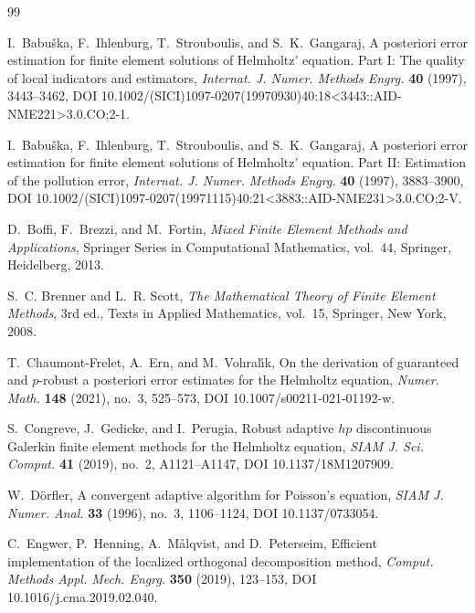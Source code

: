 \begin{thebibliography}{99}

I.~Babu\v{s}ka, F.~Ihlenburg, T.~Strouboulis, and S.~K.~Gangaraj,
A posteriori error estimation for finite element solutions of Helmholtz'
equation. Part I: The quality of local indicators and estimators,
\emph{Internat. J. Numer. Methods Engrg.} \textbf{40} (1997),
3443--3462,
DOI 10.1002/(SICI)1097-0207(19970930)40:18<3443::AID-NME221>3.0.CO;2-1.

I.~Babu\v{s}ka, F.~Ihlenburg, T.~Strouboulis, and S.~K.~Gangaraj,
A posteriori error estimation for finite element solutions of Helmholtz'
equation. Part II: Estimation of the pollution error,
\emph{Internat. J. Numer. Methods Engrg.} \textbf{40} (1997),
3883--3900,
DOI 10.1002/(SICI)1097-0207(19971115)40:21<3883::AID-NME231>3.0.CO;2-V.

D.~Boffi, F.~Brezzi, and M.~Fortin,
\emph{Mixed Finite Element Methods and Applications},
Springer Series in Computational Mathematics, vol.~44,
Springer, Heidelberg, 2013.

S.~C. Brenner and L.~R. Scott,
\emph{The Mathematical Theory of Finite Element Methods},
3rd ed., Texts in Applied Mathematics, vol.~15,
Springer, New York, 2008.

T.~Chaumont-Frelet, A.~Ern, and M.~Vohral\'{\i}k,
On the derivation of guaranteed and $p$-robust a posteriori error
estimates for the Helmholtz equation,
\emph{Numer. Math.} \textbf{148} (2021), no.~3, 525--573,
DOI 10.1007/s00211-021-01192-w.

S.~Congreve, J.~Gedicke, and I.~Perugia,
Robust adaptive $hp$ discontinuous Galerkin finite element methods for the
Helmholtz equation,
\emph{SIAM J. Sci. Comput.} \textbf{41} (2019), no.~2,
A1121--A1147, DOI 10.1137/18M1207909.

W.~D\"orfler,
A convergent adaptive algorithm for Poisson's equation,
\emph{SIAM J. Numer. Anal.} \textbf{33} (1996), no.~3, 1106--1124,
DOI 10.1137/0733054.

C.~Engwer, P.~Henning, A.~M{\aa}lqvist, and D.~Peterseim,
Efficient implementation of the localized orthogonal decomposition method,
\emph{Comput. Methods Appl. Mech. Engrg.} \textbf{350} (2019),
123--153, DOI 10.1016/j.cma.2019.02.040.


\end{thebibliography}
